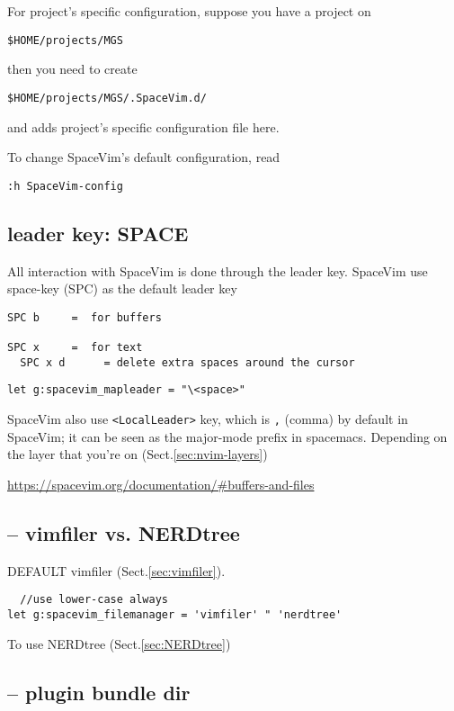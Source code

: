 For project's specific configuration, suppose you have a project on
\begin{verbatim}
$HOME/projects/MGS
\end{verbatim}
then you need to create
\begin{verbatim}
$HOME/projects/MGS/.SpaceVim.d/
\end{verbatim}
and adds project's specific configuration file here.


To change SpaceVim's default configuration, read
\begin{verbatim}
:h SpaceVim-config
\end{verbatim}

\subsection{leader key: SPACE}
\label{sec:SpaceVim-leader-key}


All interaction with SpaceVim is done through the leader key.
SpaceVim use space-key (SPC) as the default leader key
\begin{verbatim}
SPC b     =  for buffers

SPC x     =  for text
  SPC x d      = delete extra spaces around the cursor
\end{verbatim}

\begin{verbatim}
let g:spacevim_mapleader = "\<space>"
\end{verbatim}

SpaceVim also use \verb!<LocalLeader>! key, which is \verb!,! (comma) by default
in SpaceVim; it can be seen as the major-mode prefix in spacemacs.
 Depending on the layer that you're on (Sect.\ref{sec:nvim-layers})

\url{https://spacevim.org/documentation/#buffers-and-files}

\subsection{-- vimfiler vs. NERDtree}

DEFAULT vimfiler (Sect.\ref{sec:vimfiler}).

\begin{verbatim}
  //use lower-case always
let g:spacevim_filemanager = 'vimfiler' " 'nerdtree'
\end{verbatim}
To use NERDtree (Sect.\ref{sec:NERDtree})

\subsection{-- plugin bundle dir}

